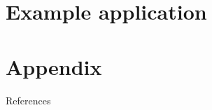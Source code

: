 \documentclass[utf-8, 10pt, aspectratio=1610]{beamer}
\begin{document}
\section{Example application}

\appendix
\section{Appendix}
\begin{frame}[allowframebreaks]{References}
	\printbibliography[heading=none]
\end{frame}
\end{document}
